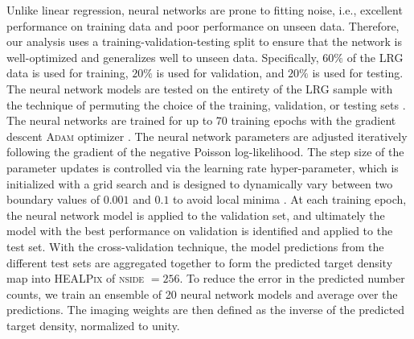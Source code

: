 Unlike linear regression, neural networks are prone to fitting noise, i.e., excellent performance on training data and poor performance on unseen data. Therefore, our analysis uses a training-validation-testing split to ensure that the network is well-optimized and generalizes well to unseen data. Specifically, $60\%$ of the LRG data is used for training, $20\%$ is used for validation, and $20\%$ is used for testing.  The neural network models are tested on the entirety of the LRG sample with the technique of permuting the choice of the training, validation, or testing sets \citep{arlot2010survey}. The neural networks are trained for up to 70 training epochs with the gradient descent \textsc{Adam} optimizer \citep{2017arXiv171105101L}. The neural network parameters are adjusted iteratively following the gradient of the negative Poisson log-likelihood. The step size of the parameter updates is controlled via the learning rate hyper-parameter, which is initialized with a grid search and is designed to dynamically vary between two boundary values of $0.001$ and $0.1$ to avoid local minima \citep[see, also,][]{2016arXiv160803983L}. At each training epoch, the neural network model is applied to the validation set, and ultimately the model with the best performance on validation is identified and applied to the test set. With the cross-validation technique, the model predictions from the different test sets are aggregated together to form the predicted target density map into \textsc{HEALPix} of \textsc{nside} $=256$. To reduce the error in the predicted number counts, we train an ensemble of 20 neural network models and average over the predictions. The imaging weights are then defined as the inverse of the predicted target density, normalized to unity.

